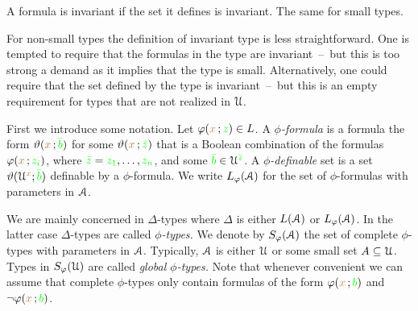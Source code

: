 A formula is invariant if the set it defines is invariant.
The same for small types.

For non-small types the definition of invariant type is less straightforward.
One is tempted to require that the formulas in the type are invariant~--~but this is too strong a demand as it implies that the type is small.
Alternatively, one could require that the set defined by the type is invariant~--~but this is an empty requirement for types that are not realized in $\EuScript U$.

First we introduce some notation.
Let $\varphi({\color{brown} x}\,;{\color{green} z})\in L$.
A \emph{$\phi$-formula\/} is a formula the form $\vartheta({\color{brown} x}\,;{\color{green}\bar b})$ for some $\vartheta({\color{brown} x}\,;{\color{green}\bar z})$ that is a Boolean combination of the formulas $\varphi({\color{brown} x}\,;{\color{green} z_i})$, where ${\color{green}\bar z}={\color{green} z_1},\dots,{\color{green} z_n}$, and some ${\color{green}\bar b}\in\EuScript U^{\color{green}\bar z}$.
A \emph{$\phi$-definable\/} set is a set  $\vartheta(\EuScript U^{\color{brown} x};{\color{green}\bar b})$ definable by a $\phi$-formula.
We write \emph{$L_\varphi(\EuScript A)$\/} for the set of $\phi$-formulas with parameters in $\EuScript A$.

We are mainly concerned in $\Delta$-types where $\Delta$ is either $L(\EuScript A)$ or $L_\varphi(\EuScript A)$.
In the latter case $\Delta$-types are called \emph{$\phi$-types.}
We denote by \emph{$S_\varphi(\EuScript A)$\/} the set of complete $\phi$-types with parameters in $\EuScript A$.
Typically, $\EuScript A$ is either $\EuScript U$ or some small set $A\subseteq\EuScript U$.
Types in \emph{$S_{\varphi}(\EuScript U)$\/} are called \emph{global $\phi$-types.}
Note that whenever convenient we can assume that complete $\phi$-types only contain formulas of the form $\varphi({\color{brown} x}\,;{\color{green} b})$ and $\neg\varphi({\color{brown} x}\,;{\color{green} b})$.
   

% 

